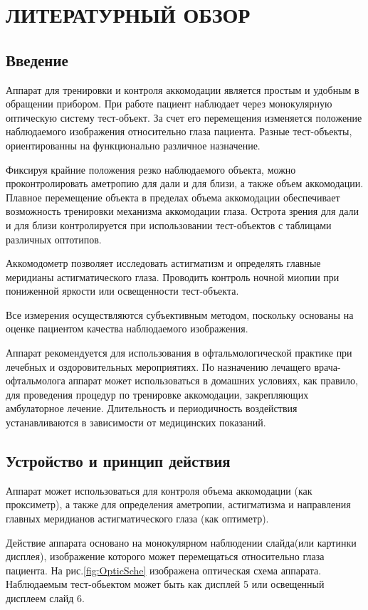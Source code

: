 \chapter{ЛИТЕРАТУРНЫЙ ОБЗОР}
\section{Введение}
Аппарат для тренировки и контроля аккомодации является простым и удобным в обращении прибором. При работе пациент наблюдает через монокулярную оптическую систему тест-объект. За счет его перемещения изменяется положение наблюдаемого изображения относительно глаза пациента. Разные тест-объекты, ориентированны на функционально различное назначение. 

Фиксируя крайние положения резко наблюдаемого объекта, можно проконтролировать аметропию  для дали и для близи, а также объем аккомодации. Плавное перемещение объекта в пределах объема аккомодации обеспечивает возможность тренировки механизма аккомодации глаза. Острота зрения для дали и для близи контролируется при использовании тест-объектов с таблицами различных оптотипов.

Аккомодометр позволяет исследовать астигматизм и определять главные меридианы астигматического глаза. Проводить контроль ночной миопии при пониженной яркости или освещенности тест-объекта. 

Все измерения осуществляются субъективным методом, поскольку основаны на оценке пациентом качества наблюдаемого изображения.

Аппарат рекомендуется для использования в офтальмологической практике при лечебных и оздоровительных мероприятиях. По назначению лечащего врача-офтальмолога аппарат может использоваться в домашних условиях, как правило, для проведения процедур по тренировке аккомодации, закрепляющих амбулаторное лечение. Длительность и периодичность воздействия устанавливаются в зависимости от медицинских показаний.

\section{Устройство и принцип действия}
Аппарат может использоваться для контроля объема аккомодации (как проксиметр), а также для определения аметропии, астигматизма и направления главных меридианов астигматического глаза (как оптиметр). 

Действие аппарата основано на монокулярном наблюдении слайда(или картинки дисплея), изображение которого может перемещаться относительно глаза пациента. На рис.\ref{fig:OpticSche} изображена оптическая схема аппарата. Наблюдаемым тест-обьектом может быть как дисплей 5 или освещенный дисплеем слайд 6.

